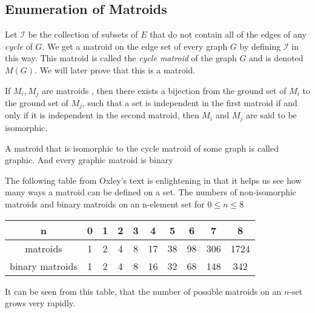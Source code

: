 \documentclass[../main.tex]{subfiles}
\begin{document}
\subsection{Enumeration of Matroids}
\begin{defn}
Let $\mathcal{I}$ be the collection of subsets of $E$ that do not contain all of the edges of any \textit{cycle} of $G.$
We get a matroid on the edge set of every graph $G$ by defining $\mathcal{I}$ in this way. This matroid is called the \textit{cycle matroid} of the graph $G$ and is denoted $M(G).$ We will later prove that this is a matroid.
\end{defn}

\begin{defn}
If $M_i, M_j$ are matroids , then there exists a bijection from the ground set of $M_i$ to the ground set of $M_j$, such that a set is independent in the first matroid if and only if it is independent in the second matroid, then $M_i$ and $M_j$ are said to be isomorphic. 
\end{defn}

\begin{note}
A matroid that is isomorphic to the cycle matroid of some graph is called graphic.
And every graphic matroid is binary
\end{note}

The following table from Oxley's text \cite{ox_book} is enlightening in that it helps us see how many ways a matroid can be defined on a set. 
\noindent The numbers of non-isomorphic matroids and binary matroids on an n-element set for $0 \leq n \leq  8$
\begin{center}
 \begin{tabular}{| c c c c c c c c c c |} 
 \hline
 n & 0 & 1 & 2 & 3 & 4 & 5 & 6 & 7 & 8 \\ [0.5ex] 
 \hline\hline
 matroids & 1 & 2 & 4 & 8 & 17 & 38 & 98 & 306 & 1724\\ 
 \hline
 binary matroids & 1 & 2 & 4 & 8 & 16 & 32 & 68 & 148 & 342\\
 \hline
\end{tabular}
\end{center}
It can be seen from this table, that the number of possible matroids on an $n$-set grows very rapidly.
\end{document}
